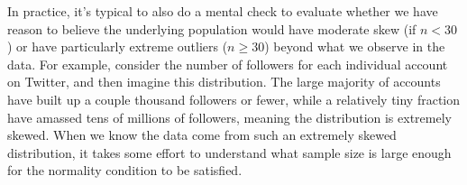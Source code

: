 In practice, it's typical to also do a mental check to evaluate
whether we have reason to believe the underlying population
would have moderate skew (if $n < 30$)
or have particularly extreme outliers ($n \geq 30$)
beyond what we observe in the data.
For example, consider the number of followers
for each individual account on Twitter,
and then imagine this distribution.
The large majority of accounts have built up
a couple thousand followers or fewer,
while a relatively tiny fraction have amassed
tens of millions of followers,
meaning the distribution is extremely skewed.
When we know the data come from such an extremely
skewed distribution,
it takes some effort to understand what sample
size is large enough for the normality condition
to be satisfied.





